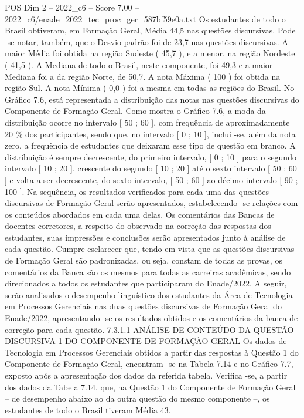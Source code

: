 \begin{textsample}{POS Dim 2 – 2022\_c6 – Score 7.00 – 2022\_c6/enade\_2022\_tec\_proc\_ger\_587bf59e0a.txt}
Os estudantes de todo o Brasil obtiveram, em Formação Geral, Média 44,5 nas questões discursivas.
Pode -se notar, também, que o Desvio-padrão foi de 23,7 nas questões discursivas.
A maior Média foi obtida na região Sudeste ( 45,7 ), e a menor, na região Nordeste ( 41,5 ).
A Mediana de todo o Brasil, neste componente, foi 49,3 e a maior Mediana foi a da região Norte, de 50,7.
A nota Máxima ( 100 ) foi obtida na região Sul.
A nota Mínima ( 0,0 ) foi a mesma em todas as regiões do Brasil.
No Gráfico 7.6, está representada a distribuição das notas nas questões discursivas do Componente de Formação Geral.
Como mostra o Gráfico 7.6, a moda da distribuição ocorre no intervalo [ 50 ; 60 ], com frequência de aproximadamente 20 \% dos participantes, sendo que, no intervalo [ 0 ; 10 ], inclui -se, além da nota zero, a frequência de estudantes que deixaram esse tipo de questão em branco.
A distribuição é sempre decrescente, do primeiro intervalo, [ 0 ; 10 ] para o segundo intervalo [ 10 ; 20 ], crescente do segundo [ 10 ; 20 ] até o sexto intervalo [ 50 ; 60 ] e volta a ser decrescente, do sexto intervalo, [ 50 ; 60 ] ao décimo intervalo [ 90 ; 100 ].
Na sequência, os resultados verificados para cada uma das questões discursivas de Formação Geral serão apresentados, estabelecendo -se relações com os conteúdos abordados em cada uma delas.
Os comentários das Bancas de docentes corretores, a respeito do observado na correção das respostas dos estudantes, suas impressões e conclusões serão apresentados junto à análise de cada questão.
Cumpre esclarecer que, tendo em vista que as questões discursivas de Formação Geral são padronizadas, ou seja, constam de todas as provas, os comentários da Banca são os mesmos para todas as carreiras acadêmicas, sendo direcionados a todos os estudantes que participaram do Enade/2022.
A seguir, serão analisados o desempenho linguístico dos estudantes da Área de Tecnologia em Processos Gerenciais nas duas questões discursivas de Formação Geral do Enade/2022, apresentando -se os resultados obtidos e os comentários da banca de correção para cada questão. 7.3.1.1 ANÁLISE DE CONTEÚDO DA QUESTÃO DISCURSIVA 1 DO COMPONENTE DE FORMAÇÃO GERAL Os dados de Tecnologia em Processos Gerenciais obtidos a partir das respostas à Questão 1 do Componente de Formação Geral, encontram -se na Tabela 7.14 e no Gráfico 7.7, exposto após a apresentação dos dados da referida tabela.
Verifica -se, a partir dos dados da Tabela 7.14, que, na Questão 1 do Componente de Formação Geral – de desempenho abaixo ao da outra questão do mesmo componente –, os estudantes de todo o Brasil tiveram Média 43.

\end{textsample}

